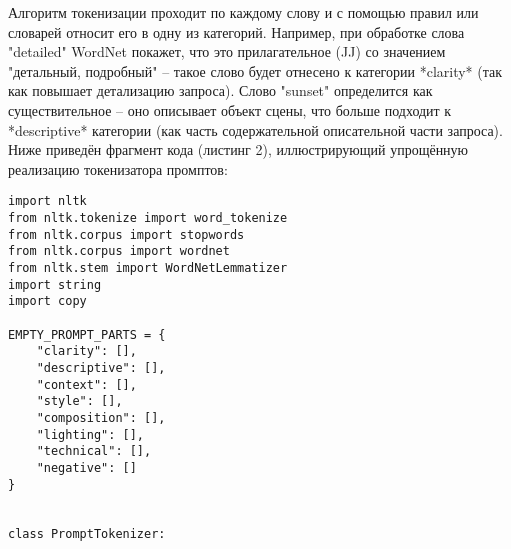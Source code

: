 Алгоритм токенизации проходит по каждому слову и с помощью правил или словарей относит его в одну из категорий. Например, при обработке слова "detailed" WordNet покажет, что это прилагательное (JJ) со значением "детальный, подробный" – такое слово будет отнесено к категории *clarity* (так как повышает детализацию запроса). Слово "sunset" определится как существительное – оно описывает объект сцены, что больше подходит к *descriptive* категории (как часть содержательной описательной части запроса). Ниже приведён фрагмент кода (листинг 2), иллюстрирующий упрощённую реализацию токенизатора промптов:

\begin{verbatim}
import nltk
from nltk.tokenize import word_tokenize
from nltk.corpus import stopwords
from nltk.corpus import wordnet
from nltk.stem import WordNetLemmatizer
import string
import copy

EMPTY_PROMPT_PARTS = {
    "clarity": [],
    "descriptive": [],
    "context": [],
    "style": [],
    "composition": [],
    "lighting": [],
    "technical": [],
    "negative": []
}


class PromptTokenizer:


\end{verbatim}
